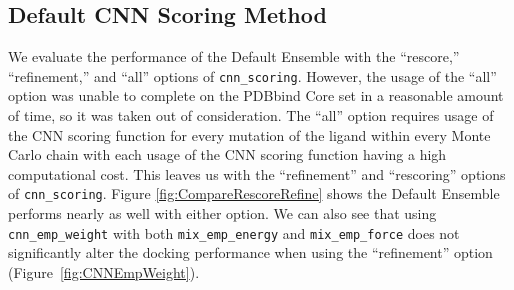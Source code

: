 \documentclass[journal=jcisd8,manuscript=article]{achemso}
\begin{document}
\subsection{Default CNN Scoring Method}
 We evaluate the performance of the Default Ensemble with the ``rescore,'' ``refinement,'' and ``all'' options of \texttt{cnn\_scoring}. However, the usage of the ``all'' option was unable to complete on the PDBbind Core set in a reasonable amount of time, so it was taken out of consideration. The ``all'' option requires usage of the CNN scoring function for every mutation of the ligand within every Monte Carlo chain with each usage of the CNN scoring function having a high computational cost. This leaves us with the ``refinement'' and ``rescoring'' options of \texttt{cnn\_scoring}. Figure \ref{fig:CompareRescoreRefine} shows the Default Ensemble performs nearly as well with either option. We can also see that using \texttt{cnn\_emp\_weight} with both \texttt{mix\_emp\_energy} and \texttt{mix\_emp\_force} does not significantly alter the docking performance when using the ``refinement'' option (Figure~\ref{fig:CNNEmpWeight}).
\end{document}
